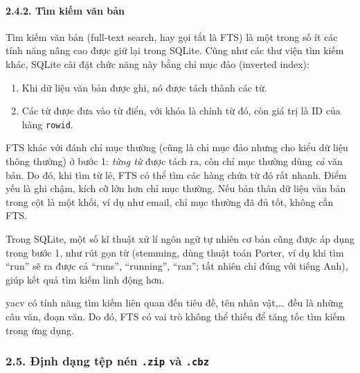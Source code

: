 \hypertarget{tuxecm-kiux1ebfm-vux103n-bux1ea3n}{%
  \paragraph{\texorpdfstring{2.4.2. Tìm kiếm văn bản
    }{2.4.2. Tìm kiếm văn bản }}\label{tuxecm-kiux1ebfm-vux103n-bux1ea3n}}

Tìm kiếm văn bản (full-text search, hay gọi tắt là FTS) là một trong số
ít các tính năng nâng cao được giữ lại trong SQLite. Cũng như các thư
viện tìm kiếm khác, SQLite cài đặt chức năng này bằng chỉ mục đảo
(inverted index):

\begin{enumerate}
  \def\labelenumi{\arabic{enumi}.}
  
  \item
        Khi dữ liệu văn bản được ghi, nó được tách thành các từ.
  \item
        Các từ được đưa vào từ điển, với khóa là chính từ đó, còn giá trị là
        ID của hàng \texttt{rowid}.
\end{enumerate}

FTS khác với đánh chỉ mục thường (cũng là chỉ mục đảo nhưng cho kiểu dữ
liệu thông thường) ở bước 1: \emph{từng từ} được tách ra, còn chỉ mục
thường dùng \emph{cả} văn bản. Do đó, khi tìm từ lẻ, FTS có thể tìm các
hàng chứa từ đó rất nhanh. Điểm yếu là ghi chậm, kích cỡ lớn hơn chỉ mục
thường. Nếu bản thân dữ liệu văn bản trong cột là một khối, ví dụ như
email, chỉ mục thường đã đủ tốt, không cần FTS.

Trong SQLite, một số kĩ thuật xử lí ngôn ngữ tự nhiên cơ bản cũng được
áp dụng trong bước 1, như rút gọn từ (stemming, dùng thuật toán Porter,
ví dụ khi tìm ``run'' sẽ ra được cả ``runs'', ``running'', ``ran''; tất
nhiên chỉ đúng với tiếng Anh), giúp kết quả tìm kiếm linh động hơn.

yacv có tính năng tìm kiếm liên quan đến tiêu đề, tên nhân vật,\ldots{}
đều là những câu văn, đoạn văn. Do đó, FTS có vai trò không thể thiếu để
tăng tốc tìm kiếm trong ứng dụng.

\hypertarget{ux111ux1ecbnh-dux1ea1ng-tux1ec7p-nuxe9n-.zip-vuxe0-.cbz}{%
  \subsubsection{\texorpdfstring{2.5. Định dạng tệp nén \texttt{.zip} và
      \texttt{.cbz}
    }{2.5. Định dạng tệp nén .zip và .cbz }}\label{ux111ux1ecbnh-dux1ea1ng-tux1ec7p-nuxe9n-.zip-vuxe0-.cbz}}

